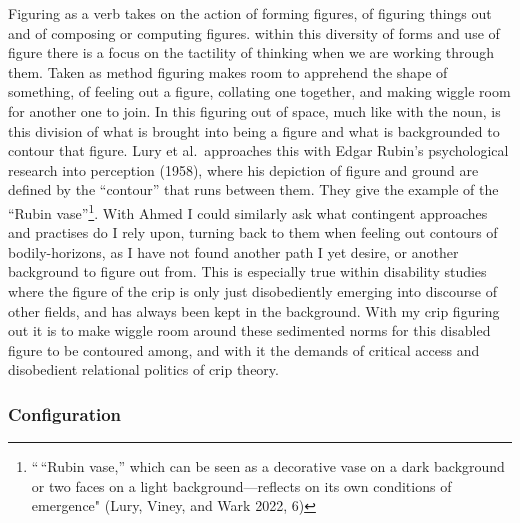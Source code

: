 Figuring as a verb takes on the action of forming figures, of figuring
things out and of composing or computing figures. within this diversity
of forms and use of figure there is a focus on the tactility of thinking
when we are working through them. Taken as method figuring makes room to
apprehend the shape of something, of feeling out a figure, collating one
together, and making wiggle room for another one to join. In this
figuring out of space, much like with the noun, is this division of what
is brought into being a figure and what is backgrounded to contour that
figure. Lury et al.~approaches this with Edgar Rubin's psychological
research into perception (1958), where his depiction of figure and
ground are defined by the ``contour'' that runs between them. They give
the example of the ``Rubin vase''\footnote{``\,``Rubin vase,'' which can
  be seen as a decorative vase on a dark background or two faces on a
  light background---reflects on its own conditions of emergence" (Lury,
  Viney, and Wark 2022, 6)}. With Ahmed I could similarly ask what
contingent approaches and practises do I rely upon, turning back to them
when feeling out contours of bodily-horizons, as I have not found
another path I yet desire, or another background to figure out from.
This is especially true within disability studies where the figure of
the crip is only just disobediently emerging into discourse of other
fields, and has always been kept in the background. With my crip
figuring out it is to make wiggle room around these sedimented norms for
this disabled figure to be contoured among, and with it the demands of
critical access and disobedient relational politics of crip theory.

\hypertarget{configuration}{%
\subsubsection[Configuration]{\texorpdfstring{\protect\hypertarget{anchor}{}{}Configuration}{Configuration}}\label{configuration}}

